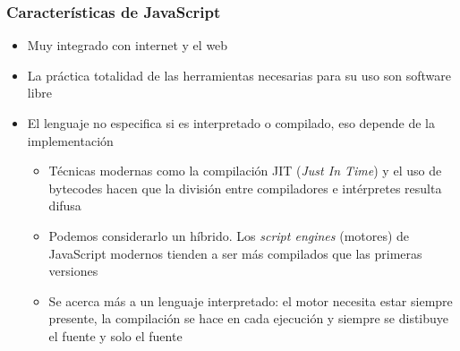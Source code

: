\documentclass[ucs]{beamer}
\begin{document}
\begin{frame}[fragile]
\frametitle{Características de JavaScript}
\begin{itemize}
\item
Muy integrado con internet y el web

\item
La práctica totalidad de las herramientas necesarias para su uso son software libre

\item
El lenguaje no especifica si es interpretado o compilado, eso depende
de la implementación


    \begin{itemize}
    \item
Técnicas modernas como la compilación JIT (\emph{Just In Time}) y el uso
de bytecodes hacen que la división entre compiladores e intérpretes resulta difusa

    \item
Podemos considerarlo un híbrido.
Los \emph{script engines} (motores) de JavaScript modernos tienden a ser más compilados
que las primeras versiones

    \item
Se acerca más a un lenguaje interpretado: el motor necesita estar siempre presente, la
compilación se hace en cada ejecución y siempre se distibuye el fuente y solo el fuente
    \end{itemize}


\end{itemize}

\end{frame}
\end{document}

